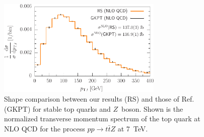\documentclass{JHEP3}
\def\ttbZ{t\bar{t}Z}
\begin{document}
\begin{figure}[t]
\centering
\includegraphics[width=0.7\textwidth]{./Troc_pTtop.pdf}
\caption{\label{fig:i} Shape comparison between our results (RS) and those of Ref.~\cite{Garzelli:2012bn} (GKPT) for 
stable top quarks and $Z$~boson. Shown is the normalized transverse momentum spectrum of the top quark at NLO QCD for the process $pp \to \ttbZ$ at 7~TeV.
}
\end{figure}
\end{document}
